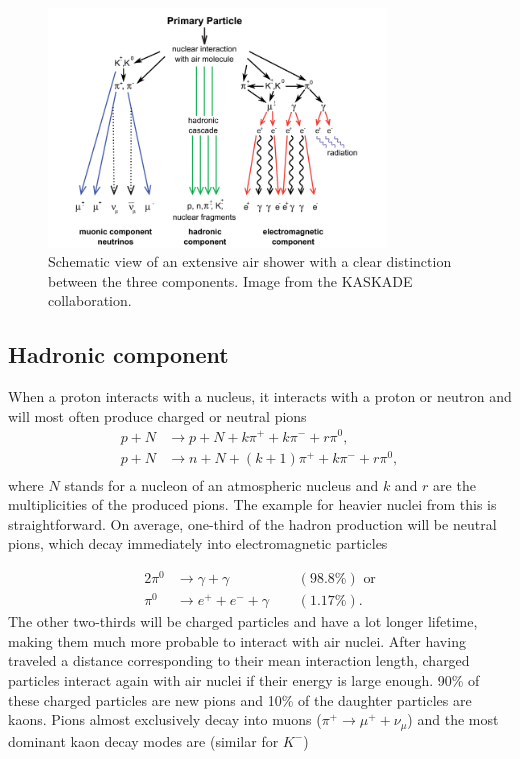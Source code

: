 \begin{figure}
\centering
\includegraphics[width=0.8\textwidth]{chapter3/img/airshower.png}
\caption{Schematic view of an extensive air shower with a clear distinction between the three components. Image from the KASKADE collaboration.}
\label{fig:airshower}
\end{figure} 

\subsection{Hadronic component}
When a proton interacts with a nucleus, it interacts with a proton or neutron and will most often produce charged or neutral pions
\begin{equation}
\begin{split}
p+N &\rightarrow p+N + k\pi^+ + k\pi^- +r\pi^0,\\
p+N &\rightarrow n+N + (k+1)\pi^+ + k\pi^- + r\pi^0,\\
\end{split}
\end{equation}
where $N$ stands for a nucleon of an atmospheric nucleus and $k$ and $r$ are the multiplicities of the produced pions. The example for heavier nuclei from this is straightforward. On average, one-third of the hadron production will be neutral pions, which decay immediately into electromagnetic particles 

\begin{alignat}{2}
\pi^0 &\rightarrow \gamma  +\gamma &&(98.8\%) \textrm{ or}\\
\pi^0 &\rightarrow e^+ + e^- + \gamma \ \ &&(1.17\%).
\end{alignat}
The other two-thirds will be charged particles and have a lot longer lifetime, making them much more probable to interact with air nuclei. After having traveled a distance corresponding to their mean interaction length, charged particles interact again with air nuclei if their energy is large enough. 90\% of these charged particles are new pions and 10\% of the daughter particles are kaons. Pions almost exclusively decay into muons ($\pi^+ \rightarrow \mu^+ + \nu_{\mu}$) and the most dominant kaon decay modes are (similar for $K^-$) \cite{PDG2018url}

